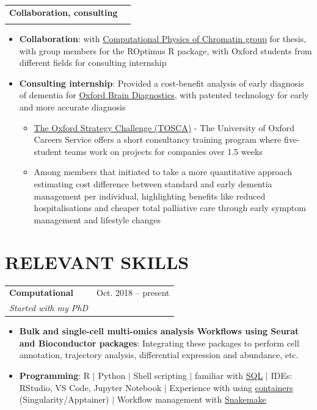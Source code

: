 \documentclass{article}
\makeatletter
\newcommand{\resumeItem}[2]{
  \item\small{
    \textbf{#1}{: #2 \vspace{-2pt}}
  }
}
\newcommand{\resumeSubheading}[4]{
  \vspace{-1pt}\item
    \begin{tabular*}{0.97\textwidth}[t]{l@{\extracolsep{\fill}}r}
      \textbf{#1} & #2 \\
      \textit{\small#3} & \textit{\small #4} \\
    \end{tabular*}\vspace{-5pt}
}
\newcommand{\resumeItemListStart}{\begin{itemize}}
\newcommand{\resumeItemListEnd}{\end{itemize}\vspace{-5pt}}
\makeatother
\begin{document}
    \resumeSubheading
        {Collaboration, consulting}{}{}{}
            \resumeItemListStart
                \resumeItem{Collaboration}{with \href{http://www.collepardolab.org/}{Computational Physics of Chromatin group} for thesis, with group members for the ROptimus R package, with Oxford students from different fields for consulting internship}
                \resumeItem{Consulting internship}{Provided a cost-benefit analysis of early diagnosis of dementia for \href{https://www.oxfordbraindiagnostics.com/}{Oxford Brain Diagnostics}, with patented technology for early and more accurate diagnosis}
                    \begin{itemize}
                        \item {\href{https://www.careers.ox.ac.uk/oxford-strategy-challenge}{The Oxford Strategy Challenge (TOSCA)} - The University of Oxford Careers Service offers a short consultancy training program where five-student teams work on projects for companies over 1.5 weeks}
                        \item {Among members that initiated to take a more quantitative approach estimating cost difference between standard and early dementia management per individual, highlighting benefits like reduced hospitalisations and cheaper total palliative care through early symptom management and lifestyle changes}
                    \end{itemize}
            \resumeItemListEnd

\section{RELEVANT SKILLS}
        \resumeSubheading
        {Computational}{Oct. 2018 -- present}{Started with my PhD}{}
            \resumeItemListStart
                \resumeItem {Bulk and single-cell multi-omics analysis Workflows using Seurat and Bioconductor packages}{Integrating these packages to perform cell annotation, trajectory analysis, differential expression and abundance, etc.}
                \resumeItem{Programming}{R $|$ Python $|$ Shell scripting $|$ familiar with \href{https://learn.365datascience.com/certificates/CC-1C72E62035/}{SQL} $|$ IDEs: RStudio, VS Code, Jupyter Notebook $|$ Experience with using \href{https://github.com/liezeltamon/neuron-microglia_coculture/tree/main/container}{containers} (Singularity/Apptainer) $|$ Workflow management with \href{https://github.com/liezeltamon/single-cell-preprocess}{Snakemake}}
            \resumeItemListEnd
\end{document}
